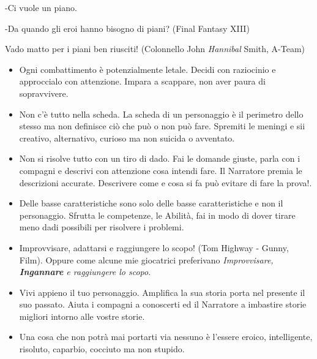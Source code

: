 \begin{multicols}{2}
\begin{changemargin}{0.3cm}{0.3cm}\begin{enfasi}{
-\noindent Ci vuole un piano.

-\noindent Da quando gli eroi hanno bisogno di piani? (Final Fantasy XIII)

\medskip

Vado matto per i piani ben riusciti! (Colonnello John \emph{Hannibal} Smith, A-Team)}
\end{enfasi}\end{changemargin}\medskip

\begin{itemize}[leftmargin=*] \setlength{\itemsep}{0pt}

\item
Ogni combattimento è potenzialmente letale. Decidi con raziocinio e approccialo con attenzione. Impara a scappare, non aver paura di sopravvivere.

\item
Non c'è tutto nella scheda. La scheda di un personaggio è il perimetro dello stesso ma non definisce ciò che può o non può fare. Spremiti le meningi e sii creativo, alternativo, curioso ma non suicida o avventato.

\item
Non si risolve tutto con un tiro di dado. Fai le domande giuste, parla con i compagni e descrivi con attenzione cosa intendi fare. Il Narratore premia le descrizioni accurate. Descrivere come e cosa si fa può evitare di fare la prova!.

\item
Delle basse caratteristiche sono solo delle basse caratteristiche e non il personaggio. Sfrutta le competenze, le Abilità, fai in modo di dover tirare meno dadi possibili per risolvere i problemi.

\item
Improvvisare, adattarsi e raggiungere lo scopo! (Tom Highway - Gunny, Film). Oppure come alcune mie giocatrici preferivano \emph{Improvvisare, \textbf{Ingannare} e raggiungere lo scopo}.

\item
Vivi appieno il tuo personaggio. Amplifica la sua storia porta nel presente il suo passato. Aiuta i compagni a conoscerti ed il Narratore a imbastire storie migliori intorno alle vostre storie.

\item
Una cosa che non potrà mai portarti via nessuno è l'essere eroico, intelligente, risoluto, caparbio, cocciuto ma non stupido.


\end{itemize}
\end{multicols}
